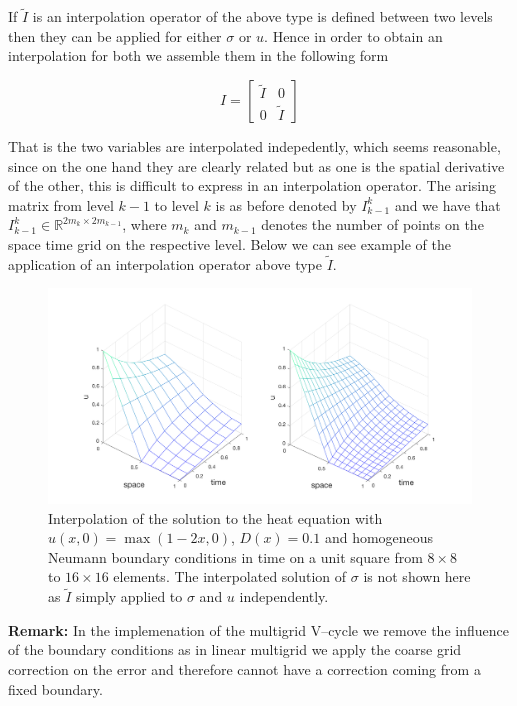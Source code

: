 \documentclass[../draft_1.tex]{subfiles}
\begin{document}
If $\tilde{I}$ is an interpolation operator of the above type is defined between two levels then they can be applied for either $\sigma$ or $u$. Hence in order to obtain an interpolation for both we assemble them in the following form 
\begin{ceqn}
	\begin{equation}
	I = \begin{bmatrix}
	\tilde{I} & 0 \\
	0 & 	\tilde{I}
	\end{bmatrix}
	\end{equation}
\end{ceqn}
That is the two variables are interpolated indepedently, which seems reasonable, since on the one hand they are clearly related but as one is the spatial derivative of the other, this is difficult to express in an interpolation operator. The arising matrix from level $k-1$ to level $k$ is as before denoted by $I_{k-1}^k$ and we have that  $I_{k-1}^k \in \mathbb{R}^{2m_k \times 2m_{k-1}}$, where $m_k$ and $m_{k-1}$ denotes the number of points on the space time grid on the respective level. Below we can see example of the application of an interpolation operator above type $\tilde{I}$.

\begin{figure}[ht!]
	\centering
	\includegraphics[scale=0.25]{images/implementation/sol_heat_eqn_interpol}
	\caption{Interpolation of the solution to the heat equation with $u(x,0) = \max(1-2x, 0)$, $D(x) = 0.1$ and homogeneous Neumann boundary conditions in time on a unit square from $8 \times 8$ to $16 \times 16$ elements. The interpolated solution of $\sigma$ is not shown here as $\tilde{I}$ simply applied to $\sigma$ and $u$ independently.}
	\label{fig:interpolation_op}
\end{figure}

\textbf{Remark:} In the implemenation of the multigrid V--cycle we remove the influence of the boundary conditions as in linear multigrid we apply the coarse grid correction on the error and therefore cannot have a correction coming from a fixed boundary. 
\end{document}
